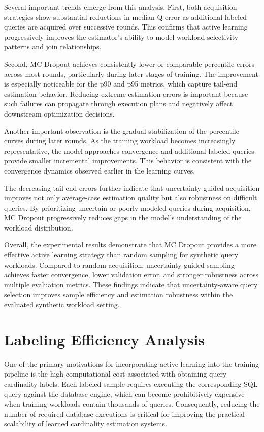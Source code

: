 Several important trends emerge from this analysis. First, both acquisition strategies show substantial reductions in median Q-error as additional labeled queries are acquired over successive rounds. This confirms that active learning progressively improves the estimator’s ability to model workload selectivity patterns and join relationships.

Second, MC Dropout achieves consistently lower or comparable percentile errors across most rounds, particularly during later stages of training. The improvement is especially noticeable for the p90 and p95 metrics, which capture tail-end estimation behavior. 
Reducing extreme estimation errors is important because such failures can propagate through execution plans and negatively affect downstream optimization decisions.

Another important observation is the gradual stabilization of the percentile curves during later rounds. As the training workload becomes increasingly representative, the model approaches convergence and additional labeled queries provide smaller incremental improvements. This behavior is consistent with the convergence dynamics observed earlier in the learning curves.

The decreasing tail-end errors further indicate that uncertainty-guided acquisition improves not only average-case estimation quality but also robustness on difficult queries. By prioritizing uncertain or poorly modeled queries during acquisition, MC Dropout progressively reduces gaps in the model’s understanding of the workload distribution.

Overall, the experimental results demonstrate that MC Dropout provides a more effective active learning strategy than random sampling for synthetic query workloads. Compared to random acquisition, uncertainty-guided sampling achieves faster convergence, lower validation error, and stronger robustness across multiple evaluation metrics. These findings indicate that uncertainty-aware query selection improves sample efficiency and estimation robustness within the evaluated synthetic workload setting.

\section{Labeling Efficiency Analysis}

One of the primary motivations for incorporating active learning into the training pipeline is the high computational cost associated with obtaining query cardinality labels. Each labeled sample requires executing the corresponding SQL query against the database engine, which can become prohibitively expensive when training workloads contain thousands of queries. Consequently, reducing the number of required database executions is critical for improving the practical scalability of learned cardinality estimation systems.

